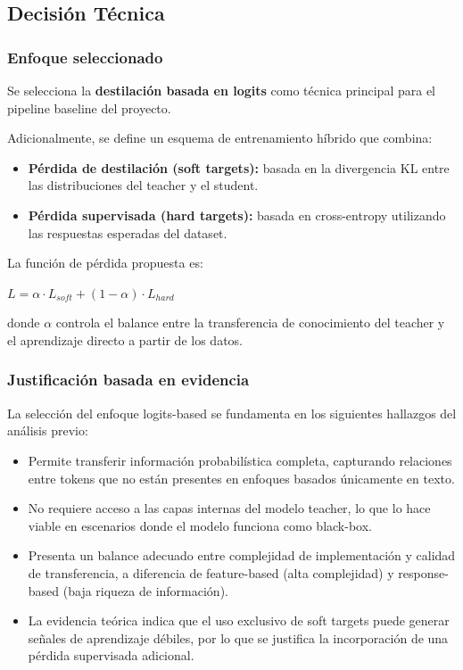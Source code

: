 \documentclass[12pt]{article}
\begin{document}
	\subsection{Decisión Técnica}
	
	\subsubsection{Enfoque seleccionado}
	
	Se selecciona la \textbf{destilación basada en logits} como técnica principal para el pipeline baseline del proyecto.
	
	Adicionalmente, se define un esquema de entrenamiento híbrido que combina:
	
	\begin{itemize}
		\item \textbf{Pérdida de destilación (soft targets):} basada en la divergencia KL entre las distribuciones del teacher y el student.
		\item \textbf{Pérdida supervisada (hard targets):} basada en cross-entropy utilizando las respuestas esperadas del dataset.
	\end{itemize}
	
	La función de pérdida propuesta es:
	
	\begin{center}
		$L = \alpha \cdot L_{soft} + (1 - \alpha) \cdot L_{hard}$
	\end{center}
	
	donde $\alpha$ controla el balance entre la transferencia de conocimiento del teacher y el aprendizaje directo a partir de los datos.
	
	\subsubsection{Justificación basada en evidencia}
	
	La selección del enfoque logits-based se fundamenta en los siguientes hallazgos del análisis previo:
	
	\begin{itemize}
		\item Permite transferir información probabilística completa, capturando relaciones entre tokens que no están presentes en enfoques basados únicamente en texto.
		
		\item No requiere acceso a las capas internas del modelo teacher, lo que lo hace viable en escenarios donde el modelo funciona como black-box.
		
		\item Presenta un balance adecuado entre complejidad de implementación y calidad de transferencia, a diferencia de feature-based (alta complejidad) y response-based (baja riqueza de información).
		
		\item La evidencia teórica indica que el uso exclusivo de soft targets puede generar señales de aprendizaje débiles, por lo que se justifica la incorporación de una pérdida supervisada adicional.
	\end{itemize}
	
\end{document}
